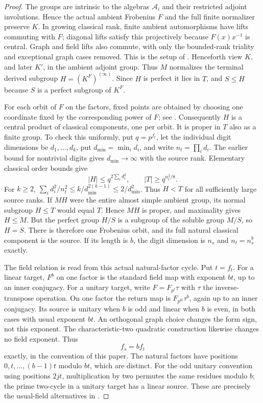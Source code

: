 \begin{proof}
The groups are intrinsic to the algebras $\mathcal A_i$ and their
restricted adjoint involutions.  Hence the actual ambient Frobenius
$F$ and the full finite normalizer preserve $K$.  In growing
classical rank, finite ambient automorphisms have lifts commuting
with $F$; diagonal lifts satisfy this projectively because
$F(x)x^{-1}$ is central.  Graph and field lifts also commute, with
only the bounded-rank triality and exceptional graph cases removed.
This is the setup of
\cite[Theorem~2 and Section~4]{LiebeckSeitzClassical1998}.
Henceforth view $K$, and later $K'$, in the ambient adjoint group.  Thus $M$ normalizes the terminal derived subgroup
$H=(K^F)^{(\infty)}$.  Since $H$ is perfect it lies in $T$, and
$S\leq H$ because $S$ is a perfect subgroup of $K^F$.

For each orbit of $F$ on the factors, fixed points are obtained by
choosing one coordinate fixed by the corresponding power of $F$;
see \cite[Proposition~2.8(ii)]{LiebeckSeitzClassical1998}.
Consequently $H$ is a central product of classical components, one
per orbit.  It is proper in $T$ also as a finite group.  To check
this uniformly, put $q=p^{f_t}$, let the individual digit dimensions
be $d_1,\ldots,d_k$, put $d_{\min}=\min_i d_i$, and write
$n_t=\prod_i d_i$.  The earlier bound for nontrivial digits gives
$d_{\min}\to\infty$ with the source rank.
Elementary classical order bounds give
\[
 |H|\leq q^{2\sum_i d_i^2},\qquad
 |T|\geq q^{n_t^2/8}.
\]
For $k\geq2$,
$\sum_i d_i^2/n_t^2\leq k/d_{\min}^{2(k-1)}\leq2/d_{\min}^2$.
Thus $H<T$ for all sufficiently large source ranks.  If $MH$
were the entire almost simple ambient group, its normal subgroup
$H\leq T$ would equal $T$.  Hence $MH$ is proper, and maximality
gives $H\leq M$.  But the perfect group $H/S$ is a subgroup of the
soluble group $M/S$, so $H=S$.  There is therefore one Frobenius
orbit, and its full natural classical component is the source.
If its length is $b$, the digit dimension is $n_s$ and
$n_t=n_s^b$ exactly.

The field relation is read from this actual natural-factor cycle.
Put $t=f_t$.  For a linear target, $F^b$ on one factor is the
standard field map with exponent $bt$, up to an inner conjugacy.
For a unitary target, write $F=F_{p^t}\tau$ with $\tau$ the
inverse-transpose operation.  On one factor the return map is
$F_{p^{bt}}\tau^b$, again up to an inner conjugacy.  Its source is
unitary when $b$ is odd and linear when $b$ is even, in both cases
with usual exponent $bt$.  An orthogonal graph choice changes the
form sign, not this exponent.  The characteristic-two quadratic
construction likewise changes no field exponent.  Thus
\begin{equation}\label{cls:tensor-field}
 f_s=b f_t
\end{equation}
exactly, in the convention of this paper.  The natural factors have
positions $0,t,\ldots,(b-1)t$ modulo $bt$, which are distinct.
For the odd unitary convention using positions $2jt$, multiplication
by two permutes the same residues modulo $b$; the prime two-cycle
in a unitary target has a linear source.  These are precisely the
usual-field alternatives in
\cite[Section~4(5)]{LiebeckSeitzClassical1998}.


\end{proof}
